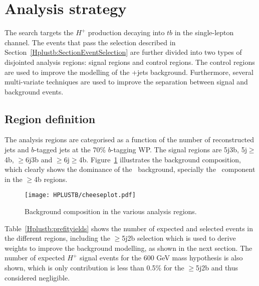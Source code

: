 \section{Analysis strategy}
The search targets the $H^+$ production decaying into $tb$ in the single-lepton channel. The events that pass the selection described in Section~\ref{Hplustb:SectionEventSelection} are further divided into two types of disjointed analysis regions: signal regions and control regions. The control regions are used to improve the modelling of the \ttbar+jets background. Furthermore, several multi-variate techniques are used to improve the separation between signal and background events.

\subsection{Region definition}

The analysis regions are categorised as a function of the number of reconstructed jets and $b$-tagged jets at the 70\% $b$-tagging WP. The signal regions are 5j3b, 5j$\geq$4b, $\geq$6j3b and $\geq$6j$\geq$4b. Figure~\ref{Hplustb:cheeseplots} illustrates the background composition, which clearly shows the dominance of the \ttbar\ background, specially the \ttb\ component in the $\geq$4b regions.

\begin{figure}[htbp]
    \RawFloats
    \begin{center}
    \texttt{[image: HPLUSTB/cheeseplot.pdf]}
    \caption{
        Background composition in the various analysis regions.
    }
    \label{Hplustb:cheeseplots}
    \end{center}
\end{figure}

Table~\ref{Hplustb:prefityields} shows the number of expected and selected events in the different regions, including the $\geq$5j2b selection which is used to derive weights to improve the background modelling, as shown in the next section. The number of expected $H^+$ signal events for the 600 GeV mass hypothesis is also shown, which is only  contribution is less than 0.5\% for the $\geq$5j2b and thus considered negligible. %

